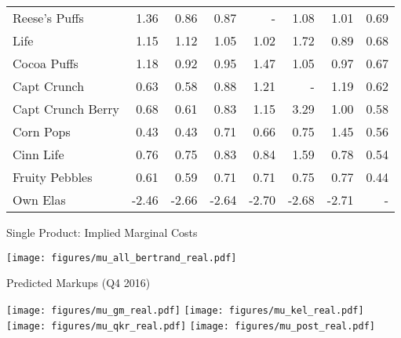 \begin{frame}[plain]
\begin{center}
{\begin{tabular}{lrrrrrrr}
Reese's Puffs       &      1.36 &       0.86 &         0.87 &          - &         1.08 &         1.01 &    0.69 \\
Life                &      1.15 &       1.12 &         1.05 &           1.02 &         1.72 &         0.89 &    0.68 \\
Cocoa Puffs         &      1.18 &       0.92 &         0.95 &           1.47 &         1.05 &         0.97 &    0.67 \\
Capt Crunch         &      0.63 &       0.58 &         0.88 &           1.21 &        - &         1.19 &    0.62 \\
Capt Crunch Berry   &      0.68 &       0.61 &         0.83 &           1.15 &         3.29 &         1.00 &    0.58 \\
Corn Pops           &      0.43 &       0.43 &         0.71 &           0.66 &         0.75 &         1.45 &    0.56 \\
Cinn Life           &      0.76 &       0.75 &         0.83 &           0.84 &         1.59 &         0.78 &    0.54 \\
Fruity Pebbles      &      0.61 &       0.59 &         0.71 &           0.71 &         0.75 &         0.77 &    0.44 \\
\midrule
Own Elas            &      -2.46&       -2.66 &       -2.64 &           -2.70 &        -2.68 &       -2.71 &  - \\
\bottomrule
\end{tabular}
}
\end{center}
\end{frame}


\begin{frame}[plain]{Single Product: Implied Marginal Costs}
\begin{center}
\texttt{[image: figures/mu\_all\_bertrand\_real.pdf]}
\end{center}
\end{frame}



\begin{frame}[plain]{Predicted Markups (Q4 2016)}
\begin{center}
\texttt{[image: figures/mu\_gm\_real.pdf]}
\texttt{[image: figures/mu\_kel\_real.pdf]}\\
\texttt{[image: figures/mu\_qkr\_real.pdf]}
\texttt{[image: figures/mu\_post\_real.pdf]}
\end{center}
\end{frame}


